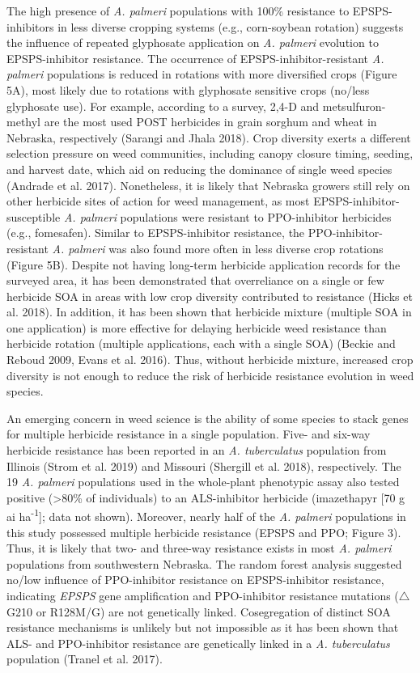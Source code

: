 \documentclass[
  12pt,
  a4paper]{article}
\begin{document}
The high presence of \emph{A. palmeri} populations with 100\% resistance
to EPSPS-inhibitors in less diverse cropping systems (e.g., corn-soybean
rotation) suggests the influence of repeated glyphosate application on
\emph{A. palmeri} evolution to EPSPS-inhibitor resistance. The
occurrence of EPSPS-inhibitor-resistant \emph{A. palmeri} populations is
reduced in rotations with more diversified crops (Figure 5A), most
likely due to rotations with glyphosate sensitive crops (no/less
glyphosate use). For example, according to a survey, 2,4-D and
metsulfuron-methyl are the most used POST herbicides in grain sorghum
and wheat in Nebraska, respectively (Sarangi and Jhala 2018). Crop
diversity exerts a different selection pressure on weed communities,
including canopy closure timing, seeding, and harvest date, which aid on
reducing the dominance of single weed species (Andrade et al. 2017).
Nonetheless, it is likely that Nebraska growers still rely on other
herbicide sites of action for weed management, as most
EPSPS-inhibitor-susceptible \emph{A. palmeri} populations were resistant
to PPO-inhibitor herbicides (e.g., fomesafen). Similar to
EPSPS-inhibitor resistance, the PPO-inhibitor-resistant \emph{A.
palmeri} was also found more often in less diverse crop rotations
(Figure 5B). Despite not having long-term herbicide application records
for the surveyed area, it has been demonstrated that overreliance on a
single or few herbicide SOA in areas with low crop diversity contributed
to resistance (Hicks et al. 2018). In addition, it has been shown that
herbicide mixture (multiple SOA in one application) is more effective
for delaying herbicide weed resistance than herbicide rotation (multiple
applications, each with a single SOA) (Beckie and Reboud 2009, Evans et
al. 2016). Thus, without herbicide mixture, increased crop diversity is
not enough to reduce the risk of herbicide resistance evolution in weed
species.

An emerging concern in weed science is the ability of some species to
stack genes for multiple herbicide resistance in a single population.
Five- and six-way herbicide resistance has been reported in an \emph{A.
tuberculatus} population from Illinois (Strom et al. 2019) and Missouri
(Shergill et al. 2018), respectively. The 19 \emph{A. palmeri}
populations used in the whole-plant phenotypic assay also tested
positive (\textgreater80\% of individuals) to an ALS-inhibitor herbicide
(imazethapyr {[}70 g ai ha\textsuperscript{-1}{]}; data not shown).
Moreover, nearly half of the \emph{A. palmeri} populations in this study
possessed multiple herbicide resistance (EPSPS and PPO; Figure 3). Thus,
it is likely that two- and three-way resistance exists in most \emph{A.
palmeri} populations from southwestern Nebraska. The random forest
analysis suggested no/low influence of PPO-inhibitor resistance on
EPSPS-inhibitor resistance, indicating \emph{EPSPS} gene amplification
and PPO-inhibitor resistance mutations (\(\triangle\)G210 or R128M/G)
are not genetically linked. Cosegregation of distinct SOA resistance
mechanisms is unlikely but not impossible as it has been shown that ALS-
and PPO-inhibitor resistance are genetically linked in a \emph{A.
tuberculatus} population (Tranel et al. 2017).
\end{document}
